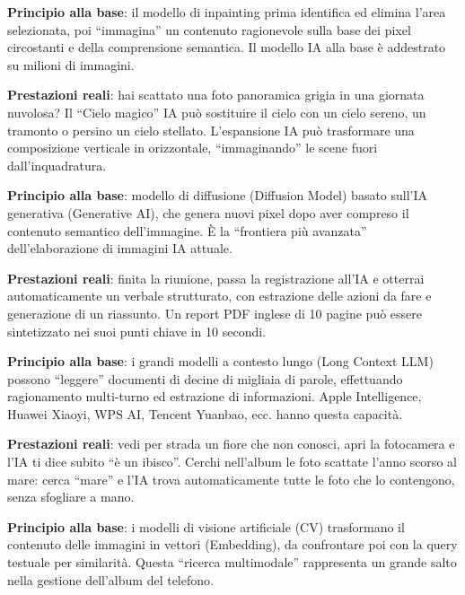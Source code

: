 \textbf{Principio alla base}: il modello di inpainting prima identifica ed elimina l'area selezionata, poi “immagina” un contenuto ragionevole sulla base dei pixel circostanti e della comprensione semantica. Il modello IA alla base è addestrato su milioni di immagini.


\textbf{Prestazioni reali}: hai scattato una foto panoramica grigia in una giornata nuvolosa? Il “Cielo magico” IA può sostituire il cielo con un cielo sereno, un tramonto o persino un cielo stellato. L'espansione IA può trasformare una composizione verticale in orizzontale, “immaginando” le scene fuori dall'inquadratura.

\textbf{Principio alla base}: modello di diffusione (Diffusion Model) basato sull'IA generativa (Generative AI), che genera nuovi pixel dopo aver compreso il contenuto semantico dell'immagine. È la “frontiera più avanzata” dell'elaborazione di immagini IA attuale.


\textbf{Prestazioni reali}: finita la riunione, passa la registrazione all'IA e otterrai automaticamente un verbale strutturato, con estrazione delle azioni da fare e generazione di un riassunto. Un report PDF inglese di 10 pagine può essere sintetizzato nei suoi punti chiave in 10 secondi.

\textbf{Principio alla base}: i grandi modelli a contesto lungo (Long Context LLM) possono “leggere” documenti di decine di migliaia di parole, effettuando ragionamento multi-turno ed estrazione di informazioni. Apple Intelligence, Huawei Xiaoyi, WPS AI, Tencent Yuanbao, ecc. hanno questa capacità.


\textbf{Prestazioni reali}: vedi per strada un fiore che non conosci, apri la fotocamera e l'IA ti dice subito “è un ibisco”. Cerchi nell'album le foto scattate l'anno scorso al mare: cerca “mare” e l'IA trova automaticamente tutte le foto che lo contengono, senza sfogliare a mano.

\textbf{Principio alla base}: i modelli di visione artificiale (CV) trasformano il contenuto delle immagini in vettori (Embedding), da confrontare poi con la query testuale per similarità. Questa “ricerca multimodale” rappresenta un grande salto nella gestione dell'album del telefono.

